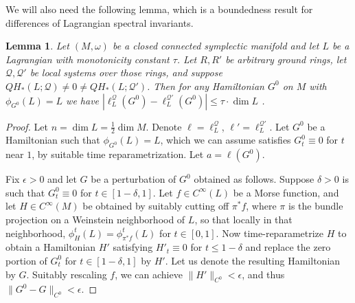 \documentclass[11pt%
]{article}
\newtheorem{lemma}[thm]{Lemma}
\theoremstyle{definition}
\newcommand{\cQ}{{\mathcal{Q}}}
\DeclareMathOperator{\0}{\operatorname{\mathbf{0}}}
\begin{document}
We will also need the following lemma, which is a boundedness result for differences of Lagrangian spectral invariants.
\begin{lemma}\label{lem:boundedness_Lag_sp_invt}Let $(M,\omega)$ be a closed connected symplectic manifold and let $L$ be a Lagrangian with monotonicity constant $\tau$. Let $R,R'$ be arbitrary ground rings, let $\cQ,\cQ'$ be local systems over those rings, and suppose $QH_*(L;\cQ)\neq 0\neq QH_*(L;\cQ')$. Then  for any Hamiltonian $G^0$ on $M$ with $\phi_{G^0}(L)=L$ we have $|\ell_L^{\cQ}(G^0)-\ell_L^{\cQ'}(G^0)|\leq \tau\cdot\dim L$ .
\end{lemma}
\begin{proof}
  Let $n=\dim L = \frac 12 \dim M$. Denote $\ell=\ell^\cQ_L$, $\ell'=\ell^{\cQ'}_L$. Let $G^0$ be a Hamiltonian such that $\phi_{G^0}(L) = L$, which we can assume satisfies $G^0_t\equiv 0$ for $t$ near $1$, by suitable time reparametrization. Let $a = \ell(G^0)$.

  Fix $\epsilon > 0$ and let $G$ be a perturbation of $G^0$ obtained as follows. Suppose $\delta > 0$ is such that $G^0_t\equiv 0$ for $t\in[1-\delta,1]$. Let $f \in C^\infty(L)$ be a Morse function, and let $H \in C^\infty(M)$ be obtained by suitably cutting off $\pi^*f$, where $\pi$ is the bundle projection on a Weinstein neighborhood of $L$, so that locally in that neighborhood, $\phi^t_H(L) = \phi_{\pi^*f}^t(L)$ for $t \in [0,1]$. Now time-reparametrize $H$ to obtain a Hamiltonian $H'$ satisfying $H'_t\equiv 0$ for $t \leq 1-\delta$ and replace the zero portion of $G^0_t$ for $t \in [1-\delta,1]$ by $H'$. Let us denote the resulting Hamiltonian by $G$. Suitably rescaling $f$, we can achieve $\|H'\|_{C^0} < \epsilon$, and thus $\|G^0-G\|_{C^0} < \epsilon$.


\end{proof}
\end{document}
